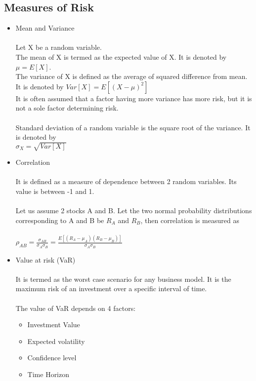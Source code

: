 \documentclass[12pt,two column]{article}
\begin{document}
\subsection{Measures of Risk}
\begin{itemize}
    \item Mean and Variance\\ \\
    Let X be a random variable.\\ 
    The mean of X is termed as the expected value of X. It is denoted by $\mu = E[X]$.\\
    The variance of X is defined as the average of squared difference from mean. It is denoted by $Var[X]=E[(X-\mu)^2]$\\
    It is often assumed that a factor having more variance has more risk, but it is not a sole factor determining risk.\\ \\
    Standard deviation of a random variable is the square root of the variance. It is denoted by \\ $\sigma_X=\sqrt{Var[X]}$\\
    
    \item Correlation\\ \\
    It is defined as a measure of dependence between 2 random variables. Its value is between -1 and 1. \\ \\
    Let us assume 2 stocks A and B. Let the two normal probability distributions corresponding to A and B be $R_A$ and $R_B$, then correlation is measured as\\ \\
    $\rho_{AB}=\frac{\sigma_{AB}}{\sigma_A\sigma_B}=\frac{E[(R_A-\mu_A)(R_B-\mu_B)]}{\sigma_A\sigma_B}$\\
    \item Value at risk (VaR)\\ \\
    It is termed as the worst case scenario for any business model. It is the maximum risk of an investment over a specific interval of time.\\ \\
    The value of VaR depends on 4 factors:
    \begin{itemize}
      \item Investment Value
      \item Expected volatility
      \item Confidence level
      \item Time Horizon
    \end{itemize}
\end{itemize}
\end{document}
